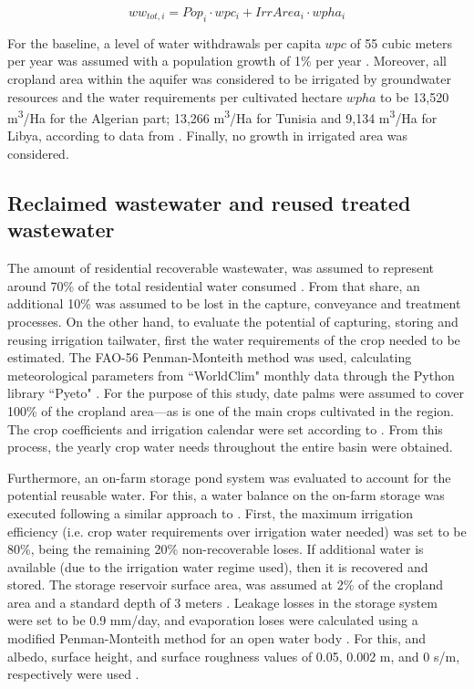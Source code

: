 \begin{equation}\label{eq:waterwithdrawals} 
ww_{tot,i} = Pop_{i}\cdot wpc_{i} +IrrArea_{i}\cdot wpha_{i} 
\end{equation}

For the baseline, a level of water withdrawals per capita $wpc$ of 55 cubic meters per year was assumed with a population growth of 1\% per year \cite{Householdwaterconsumption2014}. Moreover, all cropland area within the aquifer was considered to be irrigated by groundwater resources and the water requirements per cultivated hectare $wpha$ to be 13,520 m\textsuperscript{3}/Ha for the Algerian part; 13,266 m\textsuperscript{3}/Ha for Tunisia and 9,134 m\textsuperscript{3}/Ha for Libya, according to data from \cite{Socioeconomicaspectsirrigation2014}. Finally, no growth in irrigated area was considered.

\subsection{Reclaimed wastewater and reused treated wastewater}
The amount of residential recoverable wastewater, was assumed to represent around 70\% of the total residential water consumed \cite{unescoWastewaterUntappedResource2017}. From that share, an additional 10\% was assumed to be lost in the capture, conveyance and treatment processes.
On the other hand, to evaluate the potential of capturing, storing and reusing irrigation tailwater, first the water requirements of the crop needed to be estimated. The FAO-56 Penman-Monteith method \cite{allenFAOIrrigationDrainage1998} was used, calculating meteorological parameters from ``WorldClim" monthly data \cite{WorldClimGlobalClimate} through the Python library ``Pyeto" \cite{pyeto}. For the purpose of this study, date palms were assumed to cover 100\% of the cropland area---as is one of the main crops cultivated in the region. The crop coefficients and irrigation calendar were set according to \citet{almullaNWSAS}. From this process, the yearly crop water needs throughout the entire basin were obtained.

Furthermore, an on-farm storage pond system was evaluated to account for the potential reusable water. For this, a water balance on the on-farm storage was executed following a similar approach to \citet{reinhartSimulatedWaterQuality2019}. First, the maximum irrigation efficiency (i.e. crop water requirements over irrigation water needed) was set to be 80\%, being the remaining 20\% non-recoverable loses. If additional water is available (due to the irrigation water regime used), then it is recovered and stored. The storage reservoir surface area, was assumed at 2\% of the cropland area and a standard depth of 3 meters \cite{reinhartSimulatedWaterQuality2019}. Leakage losses in the storage system were set to be 0.9 mm/day, and evaporation loses were calculated using a modified Penman-Monteith method for an open water body \cite{reinhartSimulatedWaterQuality2019}. For this, and albedo, surface height, and surface roughness values of 0.05, 0.002 m, and 0 s/m, respectively were used \cite{princeczarneckijobym.QuantifyingCaptureUse2017}.

